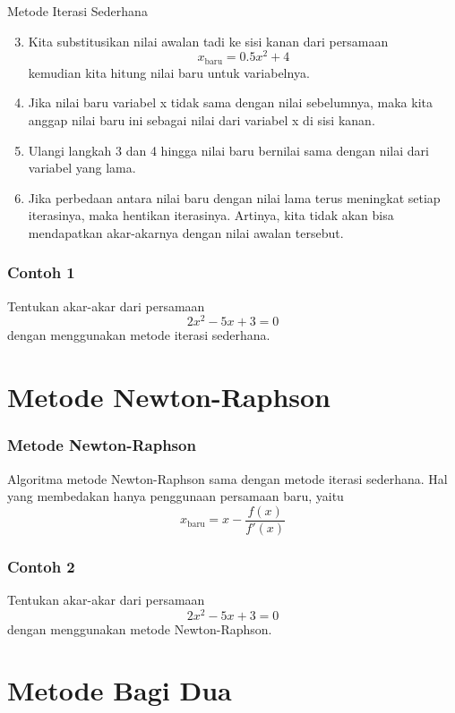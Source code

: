 \documentclass[pdflatex,compress,mathserif]{beamer}
\begin{document}
\begin{frame}{Metode Iterasi Sederhana}
	\begin{enumerate}
		\setcounter{enumi}{2}
		\item Kita substitusikan nilai awalan tadi ke sisi kanan dari persamaan $$ x_{\text{baru}} = 0.5x^2 + 4 $$ kemudian kita hitung nilai baru untuk variabelnya.
		\item Jika nilai baru variabel x tidak sama dengan nilai sebelumnya, maka kita anggap nilai baru ini sebagai nilai dari variabel x di sisi kanan.
		\item Ulangi langkah 3 dan 4 hingga nilai baru bernilai sama dengan nilai dari variabel yang lama.
		\item Jika perbedaan antara nilai baru dengan nilai lama terus meningkat setiap iterasinya, maka hentikan iterasinya. Artinya, kita tidak akan bisa mendapatkan akar-akarnya dengan nilai awalan tersebut.
	\end{enumerate}
\end{frame}

\begin{frame}
	\frametitle{Contoh 1}
	Tentukan akar-akar dari persamaan $$ 2x^2 - 5x + 3 = 0 $$ dengan menggunakan metode iterasi sederhana.
\end{frame}

\section{Metode Newton-Raphson}

\begin{frame}
	\frametitle{Metode Newton-Raphson}
	Algoritma metode Newton-Raphson sama dengan metode iterasi sederhana. Hal yang membedakan hanya penggunaan persamaan baru, yaitu $$ x_{\text{baru}} = x - \frac{f(x)}{f'(x)} $$
\end{frame}

\begin{frame}
	\frametitle{Contoh 2}
	Tentukan akar-akar dari persamaan $$ 2x^2 - 5x + 3 = 0 $$ dengan menggunakan metode Newton-Raphson.
\end{frame}

\section{Metode Bagi Dua}
\end{document}
